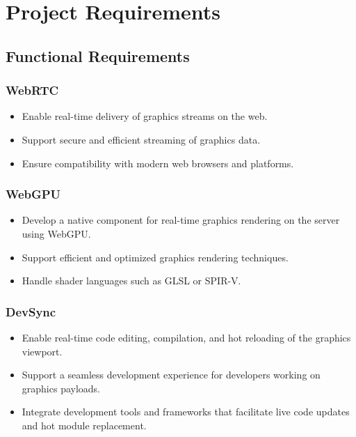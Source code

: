 
\chapter{Project Requirements} %

\label{Chapter2} %



\section{Functional Requirements}


\subsection{WebRTC}

\begin{itemize}
    \item Enable real-time delivery of graphics streams on the web.
    \item Support secure and efficient streaming of graphics data.
    \item Ensure compatibility with modern web browsers and platforms.
\end{itemize}


\subsection{WebGPU}

\begin{itemize}
    \item Develop a native component for real-time graphics rendering on the server using WebGPU.
    \item Support efficient and optimized graphics rendering techniques.
    \item Handle shader languages such as GLSL or SPIR-V.
\end{itemize}


\subsection{DevSync}

\begin{itemize}
    \item Enable real-time code editing, compilation, and hot reloading of the graphics viewport.
    \item Support a seamless development experience for developers working on graphics payloads.
    \item Integrate development tools and frameworks that facilitate live code updates and hot module replacement.
\end{itemize}


